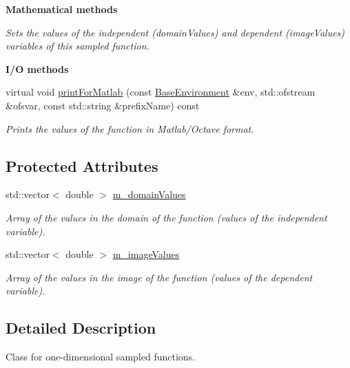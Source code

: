 \begin{Indent}{\bf Mathematical methods}
\begin{DoxyCompactItemize}
\begin{DoxyCompactList}\small\item\em Sets the values of the independent ({\ttfamily domain\-Values}) and dependent ({\ttfamily image\-Values}) variables of this sampled function. \end{DoxyCompactList}\end{DoxyCompactItemize}
\end{Indent}
\begin{Indent}{\bf I/\-O methods}\par
\begin{DoxyCompactItemize}
\item 
virtual void \hyperlink{class_q_u_e_s_o_1_1_sampled1_d1_d_function_af2968cdef2abc728fff7c50162b28464}{print\-For\-Matlab} (const \hyperlink{class_q_u_e_s_o_1_1_base_environment}{Base\-Environment} \&env, std\-::ofstream \&ofsvar, const std\-::string \&prefix\-Name) const 
\begin{DoxyCompactList}\small\item\em Prints the values of the function in Matlab/\-Octave format. \end{DoxyCompactList}\end{DoxyCompactItemize}
\end{Indent}
\subsection*{Protected Attributes}
\begin{DoxyCompactItemize}
\item 
std\-::vector$<$ double $>$ \hyperlink{class_q_u_e_s_o_1_1_sampled1_d1_d_function_a6985db1a50a72a3fb1377645ac6cd944}{m\-\_\-domain\-Values}
\begin{DoxyCompactList}\small\item\em Array of the values in the domain of the function (values of the independent variable). \end{DoxyCompactList}\item 
std\-::vector$<$ double $>$ \hyperlink{class_q_u_e_s_o_1_1_sampled1_d1_d_function_a5569dd39ba1eb7183b608b59e4919a6f}{m\-\_\-image\-Values}
\begin{DoxyCompactList}\small\item\em Array of the values in the image of the function (values of the dependent variable). \end{DoxyCompactList}\end{DoxyCompactItemize}


\subsection{Detailed Description}
Class for one-\/dimensional sampled functions. 

